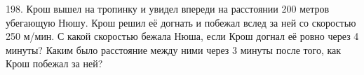 198. Крош вышел на тропинку и увидел впереди на расстоянии 200 метров убегающую Нюшу. Крош решил её догнать и побежал вслед за ней со скоростью 250 м/мин. С какой скоростью бежала Нюша, если Крош догнал её ровно через 4 минуты? Каким было расстояние между ними через 3 минуты после того, как Крош побежал за ней?\\
